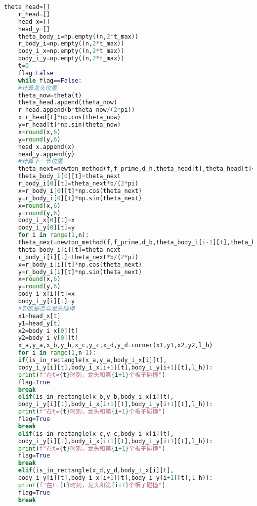 \documentclass[withoutpreface,bwprint]{cumcmthesis} %
\begin{document}
\begin{lstlisting}[language=Python]
	theta_head=[]
	r_head=[]
	head_x=[]
	head_y=[]
	theta_body_i=np.empty((n,2*t_max))
	r_body_i=np.empty((n,2*t_max))
	body_i_x=np.empty((n,2*t_max))
	body_i_y=np.empty((n,2*t_max))
	t=0
	flag=False
	while flag==False:
	#计算龙头位置
	theta_now=theta(t)
	theta_head.append(theta_now)
	r_head.append(b*theta_now/(2*pi))
	x=r_head[t]*np.cos(theta_now)
	y=r_head[t]*np.sin(theta_now)
	x=round(x,6)
	y=round(y,6)
	head_x.append(x)
	head_y.append(y)
	#计算下一节位置
	theta_next=newton_method(f,f_prime,d_h,theta_head[t],theta_head[t]+pi/2)
	theta_body_i[0][t]=theta_next
	r_body_i[0][t]=theta_next*b/(2*pi)
	x=r_body_i[0][t]*np.cos(theta_next)
	y=r_body_i[0][t]*np.sin(theta_next)
	x=round(x,6)
	y=round(y,6)
	body_i_x[0][t]=x
	body_i_y[0][t]=y
	for i in range(1,n):
	theta_next=newton_method(f,f_prime,d_b,theta_body_i[i-1][t],theta_body_i[i-1][t]+pi/2)
	theta_body_i[i][t]=theta_next
	r_body_i[i][t]=theta_next*b/(2*pi)
	x=r_body_i[i][t]*np.cos(theta_next)
	y=r_body_i[i][t]*np.sin(theta_next)
	x=round(x,6)
	y=round(y,6)
	body_i_x[i][t]=x
	body_i_y[i][t]=y
	#判断是否与龙头碰撞
	x1=head_x[t]
	y1=head_y[t]
	x2=body_i_x[0][t]
	y2=body_i_y[0][t]
	x_a,y_a,x_b,y_b,x_c,y_c,x_d,y_d=corner(x1,y1,x2,y2,l_h)
	for i in range(1,n-1):
	if(is_in_rectangle(x_a,y_a,body_i_x[i][t],
	body_i_y[i][t],body_i_x[i+1][t],body_i_y[i+1][t],l_h)):
	print(f"在t={t}时刻，龙头和第{i+1}个板子碰撞")
	flag=True
	break
	elif(is_in_rectangle(x_b,y_b,body_i_x[i][t],
	body_i_y[i][t],body_i_x[i+1][t],body_i_y[i+1][t],l_h)):
	print(f"在t={t}时刻，龙头和第{i+1}个板子碰撞")
	flag=True
	break
	elif(is_in_rectangle(x_c,y_c,body_i_x[i][t],
	body_i_y[i][t],body_i_x[i+1][t],body_i_y[i+1][t],l_h)):
	print(f"在t={t}时刻，龙头和第{i+1}个板子碰撞")
	flag=True
	break
	elif(is_in_rectangle(x_d,y_d,body_i_x[i][t],
	body_i_y[i][t],body_i_x[i+1][t],body_i_y[i+1][t],l_h)):
	print(f"在t={t}时刻，龙头和第{i+1}个板子碰撞")
	flag=True
	break
	

\end{lstlisting}
\end{document}
